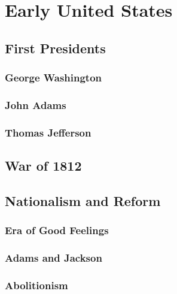 \chapter{Early United States}

\section{First Presidents}

\subsection*{George Washington}

\subsection*{John Adams}

\subsection*{Thomas Jefferson}

\section{War of 1812}

\section{Nationalism and Reform}

\subsection*{Era of Good Feelings}

\subsection*{Adams and Jackson}

\subsection*{Abolitionism}

